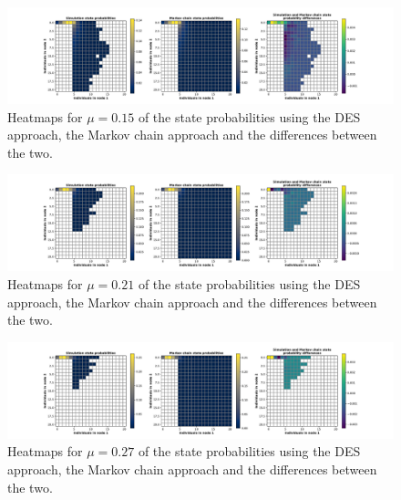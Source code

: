 \begin{figure}[H]
    \includegraphics[width=\textwidth, trim=100 10 100 10, clip]{chapters/03_queueing_model/Bin/numeric_results_and_timings/steady_state_probabilities/main_5.pdf}
    \caption{Heatmaps for \(\mu = 0.15\) of the state probabilities using the
    DES approach, the Markov chain approach and the differences between the
    two.}
    \label{fig:comparison_steady_state_probabilities_3}
\end{figure}

\begin{figure}[H]
    \includegraphics[width=\textwidth, trim=100 10 100 10, clip]{chapters/03_queueing_model/Bin/numeric_results_and_timings/steady_state_probabilities/main_7.pdf}
    \caption{Heatmaps for \(\mu = 0.21\) of the state probabilities using the
    DES approach, the Markov chain approach and the differences between the
    two.}
    \label{fig:comparison_steady_state_probabilities_4}
\end{figure}

\begin{figure}[H]
    \includegraphics[width=\textwidth, trim=100 10 100 10, clip]{chapters/03_queueing_model/Bin/numeric_results_and_timings/steady_state_probabilities/main_9.pdf}
    \caption{Heatmaps for \(\mu = 0.27\) of the state probabilities using the
    DES approach, the Markov chain approach and the differences between the
    two.}
    \label{fig:comparison_steady_state_probabilities_5}
\end{figure}

